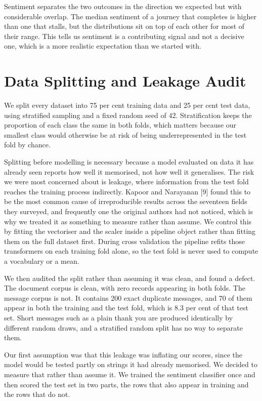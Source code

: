\documentclass[conference]{IEEEtran}
\begin{document}
Sentiment separates the two outcomes in the direction we expected but with considerable overlap. The median sentiment of a journey that completes is higher than one that stalls, but the distributions sit on top of each other for most of their range. This tells us sentiment is a contributing signal and not a decisive one, which is a more realistic expectation than we started with.

\section{Data Splitting and Leakage Audit}
We split every dataset into 75 per cent training data and 25 per cent test data, using stratified sampling and a fixed random seed of 42. Stratification keeps the proportion of each class the same in both folds, which matters because our smallest class would otherwise be at risk of being underrepresented in the test fold by chance.

Splitting before modelling is necessary because a model evaluated on data it has already seen reports how well it memorised, not how well it generalises. The risk we were most concerned about is leakage, where information from the test fold reaches the training process indirectly. Kapoor and Narayanan [9] found this to be the most common cause of irreproducible results across the seventeen fields they surveyed, and frequently one the original authors had not noticed, which is why we treated it as something to measure rather than assume. We control this by fitting the vectoriser and the scaler inside a pipeline object rather than fitting them on the full dataset first. During cross validation the pipeline refits those transformers on each training fold alone, so the test fold is never used to compute a vocabulary or a mean.

We then audited the split rather than assuming it was clean, and found a defect. The document corpus is clean, with zero records appearing in both folds. The message corpus is not. It contains 200 exact duplicate messages, and 70 of them appear in both the training and the test fold, which is 8.3 per cent of that test set. Short messages such as a plain thank you are produced identically by different random draws, and a stratified random split has no way to separate them.

Our first assumption was that this leakage was inflating our scores, since the model would be tested partly on strings it had already memorised. We decided to measure that rather than assume it. We trained the sentiment classifier once and then scored the test set in two parts, the rows that also appear in training and the rows that do not.
\end{document}
